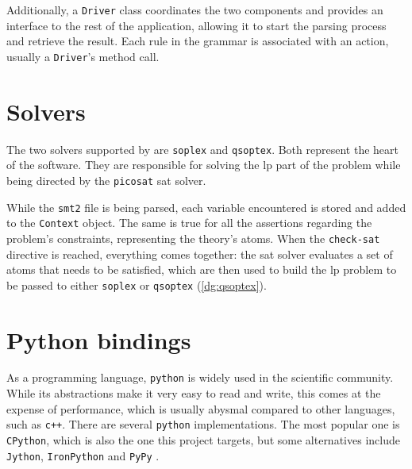 Additionally, a \texttt{Driver} class coordinates the two components and provides an interface to the rest of the application, allowing it to start the parsing process and retrieve the result.
Each rule in the grammar is associated with an action, usually a \texttt{Driver}'s method call.





\section{Solvers}

The two solvers supported by \dlinear are \texttt{soplex} and \texttt{qsoptex}.
Both represent the heart of the software.
They are responsible for solving the \gls{lp} part of the problem while being directed by the \texttt{picosat} \gls{sat} solver.

While the \texttt{smt2} file is being parsed, each variable encountered is stored and added to the \texttt{Context} object.
The same is true for all the assertions regarding the problem's constraints, representing the theory's atoms.
When the \texttt{check-sat} directive is reached, everything comes together: the \gls{sat} solver evaluates a set of atoms that needs to be satisfied, which are then used to build the \gls{lp} problem to be passed to either \texttt{soplex} or \texttt{qsoptex} (\autoref{dg:qsoptex}).


\section{Python bindings}

As a programming language, \texttt{python} is widely used in the scientific community.
While its abstractions make it very easy to read and write, this comes at the expense of performance, which is usually abysmal compared to other languages, such as \texttt{c++}.
There are several \texttt{python} implementations.
The most popular one is \texttt{CPython}, which is also the one this project targets, but some alternatives include \texttt{Jython}, \texttt{IronPython} and \texttt{PyPy} \cite{man:python-implementations}.

